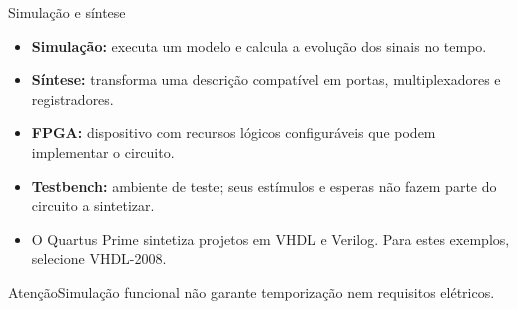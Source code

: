 \begin{frame}[t]{Simulação e síntese}
\small\begin{itemize}
\item \textbf{Simulação:} executa um modelo e calcula a evolução dos sinais no tempo.
\item \textbf{Síntese:} transforma uma descrição compatível em portas, multiplexadores e registradores.
\item \textbf{FPGA:} dispositivo com recursos lógicos configuráveis que podem implementar o circuito.
\item \textbf{Testbench:} ambiente de teste; seus estímulos e esperas não fazem parte do circuito a sintetizar.
\item O Quartus Prime sintetiza projetos em VHDL e Verilog. Para estes exemplos, selecione VHDL-2008.\end{itemize}\begin{alertblock}{Atenção}Simulação funcional não garante temporização nem requisitos elétricos.\end{alertblock}
\end{frame}
